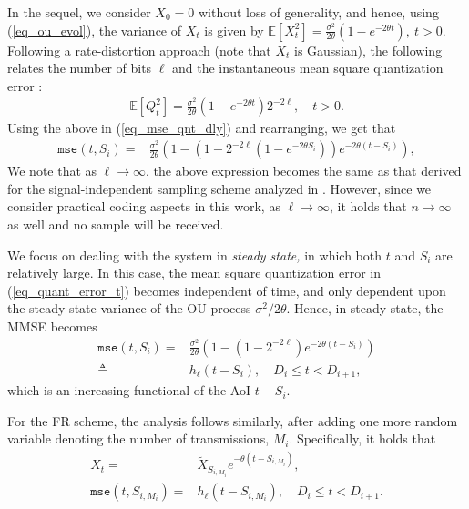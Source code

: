 \documentclass[12pt,journal,onecolumn]{IEEEtran}
\begin{document}
In the sequel, we consider $X_0=0$ without loss of generality, and hence, using (\ref{eq_ou_evol}), the variance of $X_t$ is given by $\mathbb{E}\left[X_t^2\right]=\frac{\sigma^2}{2\theta}\left(1-e^{-2\theta t}\right),~t>0$.
Following a rate-distortion approach (note that $X_t$ is Gaussian), the following relates the number of bits $\ell$ and the instantaneous mean square quantization error \cite{cover}:
\begin{align} \label{eq_quant_error_t}
\mathbb{E}\left[Q_t^2\right]=\frac{\sigma^2}{2\theta}\left(1-e^{-2\theta t}\right)2^{-2\ell}, \quad t>0.
\end{align}
Using the above in (\ref{eq_mse_qnt_dly}) and rearranging, we get that
\begin{align}
\!\!\!\texttt{mse}\!\left(t,S_i\right)\!=&\frac{\sigma^2}{2\theta}\!\left(\!1\!-\!\left(1\!-\!2^{-2\ell}\!\left(1\!-\!e^{-2\theta S_i}\right)\right)\!e^{-2\theta\left(t-S_i\right)}\!\right),
\end{align}
We note that as $\ell\rightarrow\infty$, the above expression becomes the same as that derived for the signal-independent sampling scheme analyzed in \cite{ornee-aoi-estimation-ou}. However, since we consider practical coding aspects in this work, as $\ell\rightarrow\infty$, it holds that $n\rightarrow\infty$ as well and no sample will be received.

We focus on dealing with the system in {\it steady state,} in which both $t$ and $S_i$ are relatively large. In this case, the mean square quantization error in (\ref{eq_quant_error_t}) becomes independent of time, and only dependent upon the steady state variance of the OU process $\sigma^2/2\theta$. Hence, in steady state, the MMSE becomes
\begin{align}
\texttt{mse}\left(t,S_i\right)=&\frac{\sigma^2}{2\theta}\left(1-\left(1-2^{-2\ell}\right)e^{-2\theta\left(t-S_i\right)}\right) \\
\triangleq&h_\ell\left(t-S_i\right), \quad D_i\leq t<D_{i+1}, \label{eq_mmse_iir}
\end{align}
which is an increasing functional of the AoI $t-S_i$.

For the FR scheme, the analysis follows similarly, after adding one more random variable denoting the number of transmissions, $M_i$. Specifically, it holds that
\begin{align}
\hat{X}_t=&\tilde{X}_{S_{i,M_i}}e^{-\theta\left(t-S_{i,M_i}\right)}, \\
\texttt{mse}\left(t,S_{i,M_i}\right)=&h_\ell\left(t-S_{i,M_i}\right), \quad D_i\leq t<D_{i+1}. \label{eq_mmse_fr}
\end{align}
\end{document}
